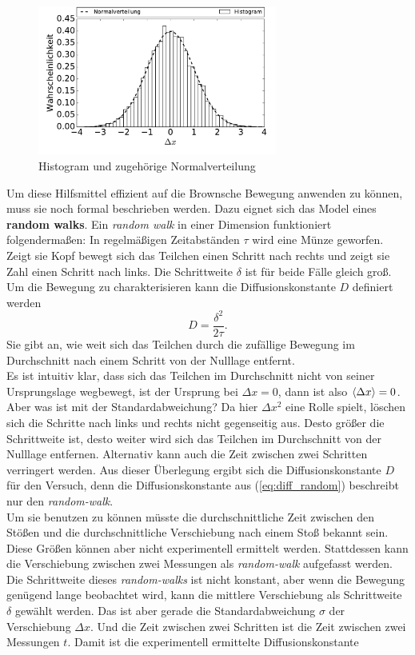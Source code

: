 \begin{figure}[h!]
  \centering
  \includegraphics[width=0.7\textwidth]{figures/histogram}
  \caption{Histogram und zugehörige Normalverteilung}\label{fig:histo}
\end{figure}
Um diese Hilfsmittel effizient auf die Brownsche Bewegung anwenden zu können, muss sie noch formal beschrieben werden. Dazu eignet sich das Model eines \textbf{random walks}. Ein \emph{random walk} in einer Dimension funktioniert folgendermaßen: In regelmäßigen Zeitabständen $\tau$ wird eine Münze geworfen. Zeigt sie Kopf bewegt sich das Teilchen einen Schritt nach rechts und zeigt sie Zahl einen Schritt nach links. Die Schrittweite $\delta$ ist für beide Fälle gleich groß. Um die Bewegung zu charakterisieren kann die Diffusionskonstante $D$ definiert werden
\begin{equation}
  D = \frac{\delta^2}{2 \tau}. \label{eq:diff_random}
\end{equation}
Sie gibt an, wie weit sich das Teilchen durch die zufällige Bewegung im Durchschnitt nach einem Schritt von der Nulllage entfernt.\\
Es ist intuitiv klar, dass sich das Teilchen im Durchschnitt nicht von seiner Ursprungslage wegbewegt, ist der Ursprung bei $\Delta x = 0$, dann ist also $\left< \Delta x \right> = 0$. Aber was ist mit der Standardabweichung? Da hier $\Delta x^2$ eine Rolle spielt, löschen sich die Schritte nach links und rechts nicht gegenseitig aus.
Desto größer die Schrittweite ist, desto weiter wird sich das Teilchen im Durchschnitt von der Nulllage entfernen. Alternativ kann auch die Zeit zwischen zwei Schritten verringert werden. Aus dieser Überlegung ergibt sich die Diffusionskonstante $D$ für den Versuch, denn die Diffusionskonstante aus (\ref{eq:diff_random}) beschreibt nur den \emph{random-walk}.\\
Um sie benutzen zu können müsste die durchschnittliche Zeit zwischen den Stößen und die durchschnittliche Verschiebung nach einem Stoß bekannt sein. Diese Größen können aber nicht experimentell ermittelt werden. Stattdessen kann die Verschiebung zwischen zwei Messungen als \emph{random-walk} aufgefasst werden. Die Schrittweite dieses \emph{random-walks} ist nicht konstant, aber wenn die Bewegung genügend lange beobachtet wird, kann die mittlere Verschiebung als Schrittweite $\delta$ gewählt werden. Das ist aber gerade die Standardabweichung $\sigma$ der Verschiebung $\Delta x$. Und die Zeit zwischen zwei Schritten ist die Zeit zwischen zwei Messungen $t$. Damit ist die experimentell ermittelte Diffusionskonstante
